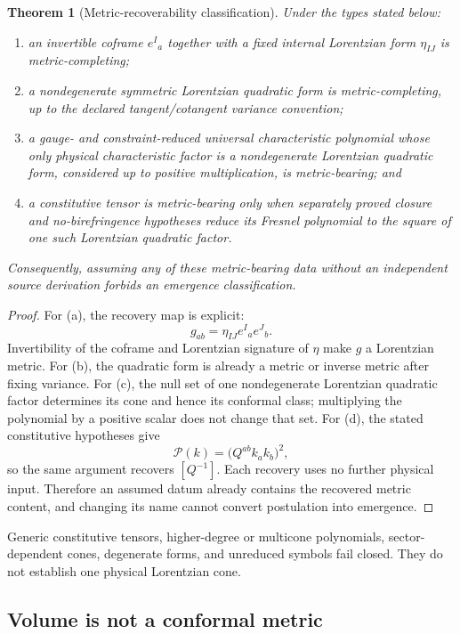 \documentclass[11pt]{article}
\newtheorem{theorem}{Theorem}
\begin{document}
\begin{theorem}[Metric-recoverability classification]
Under the types stated below:
\begin{enumerate}[label=(\alph*)]
  \item an invertible coframe \(e^I{}_a\) together with a fixed internal
  Lorentzian form \(\eta_{IJ}\) is metric-completing;
  \item a nondegenerate symmetric Lorentzian quadratic form is
  metric-completing, up to the declared tangent/cotangent variance convention;
  \item a gauge- and constraint-reduced universal characteristic polynomial
  whose only physical characteristic factor is a nondegenerate Lorentzian
  quadratic form, considered up to positive multiplication, is
  metric-bearing; and
  \item a constitutive tensor is metric-bearing only when separately proved
  closure and no-birefringence hypotheses reduce its Fresnel polynomial to the
  square of one such Lorentzian quadratic factor.
\end{enumerate}
Consequently, assuming any of these metric-bearing data without an independent
source derivation forbids an emergence classification.
\end{theorem}

\begin{proof}
For (a), the recovery map is explicit:
\[
  g_{ab}=\eta_{IJ}e^I{}_a e^J{}_b.
\]
Invertibility of the coframe and Lorentzian signature of \(\eta\) make
\(g\) a Lorentzian metric. For (b), the quadratic form is already a metric or
inverse metric after fixing variance. For (c), the null set of one
nondegenerate Lorentzian quadratic factor determines its cone and hence its
conformal class; multiplying the polynomial by a positive scalar does not
change that set. For (d), the stated constitutive hypotheses give
\[
  \mathcal P(k)=\bigl(Q^{ab}k_a k_b\bigr)^2,
\]
so the same argument recovers \([Q^{-1}]\). Each recovery uses no further
physical input. Therefore an assumed datum already contains the recovered
metric content, and changing its name cannot convert postulation into
emergence.
\end{proof}

Generic constitutive tensors, higher-degree or multicone polynomials,
sector-dependent cones, degenerate forms, and unreduced symbols fail closed.
They do not establish one physical Lorentzian cone.

\subsection{Volume is not a conformal metric}
\end{document}
